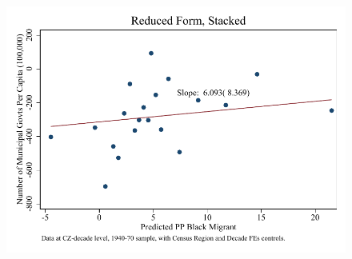 \documentclass{article}
\begin{document}
\begin{figure}
\centering
\includegraphics{figures/simplefigs/stacked_gen_muni_pc_C3_urban_rf.pdf}
\end{figure}
\clearpage
\end{document}
